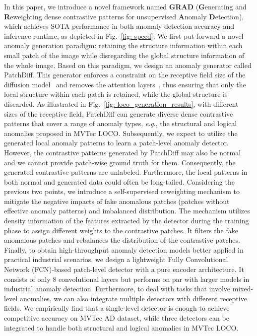 \documentclass[letterpaper]{article} %
\newcommand{\eg}{\textit{e}.\textit{g}.}
\begin{document}
In this paper, we introduce a novel framework named \textbf{GRAD} (\textbf{G}enerating and \textbf{R}eweighting dense contrastive patterns for unsupervised \textbf{A}nomaly \textbf{D}etection), which achieves SOTA performance in both anomaly detection accuracy and inference runtime, as depicted in Fig.~\ref{fig: speed}. We first put forward a novel anomaly generation paradigm: retaining the structure information within each small patch of the image while disregarding the global structure information of the whole image. Based on this paradigm, we design an anomaly generator called PatchDiff. This generator enforces a constraint on the receptive field size of the diffusion model~\cite{DDPM} and removes the attention layers~\cite{AttentionNotNeed}, thus ensuring that only the local structure within each patch is retained, while the global structure is discarded. As illustrated in Fig.~\ref{fig: loco_generation_results}, with different sizes of the receptive field, PatchDiff can generate diverse dense contrastive patterns that cover a range of anomaly types, \eg, the structural and logical anomalies proposed in MVTec LOCO. Subsequently, we expect to utilize the generated local anomaly patterns to learn a patch-level anomaly detector. However, the contrastive patterns generated by PatchDiff may also be normal and we cannot provide patch-wise ground truth for them. Consequently, the generated contrastive patterns are unlabeled. Furthermore, the local patterns in both normal and generated data could often be long-tailed. Considering the previous two points, we introduce a self-supervised reweighting mechanism to mitigate the negative impacts of fake anomalous patches (patches without effective anomaly patterns) and imbalanced distribution. The mechanism utilizes density information of the features extracted by the detector during the training phase to assign different weights to the contrastive patches. It filters the fake anomalous patches and rebalances the distribution of the contrastive patches. Finally, to obtain high-throughput anomaly detection models better applied in practical industrial scenarios, we design a lightweight Fully Convolutional Network (FCN)-based patch-level detector with a pure encoder architecture. It consists of only 8 convolutional layers but performs on par with larger models in industrial anomaly detection. Furthermore, to deal with tasks that involve mixed-level anomalies, we can also integrate multiple detectors with different receptive fields. We empirically find that a single-level detector is enough to achieve competitive accuracy on MVTec AD dataset, while three detectors can be integrated to handle both structural and logical anomalies in MVTec LOCO.
\end{document}
